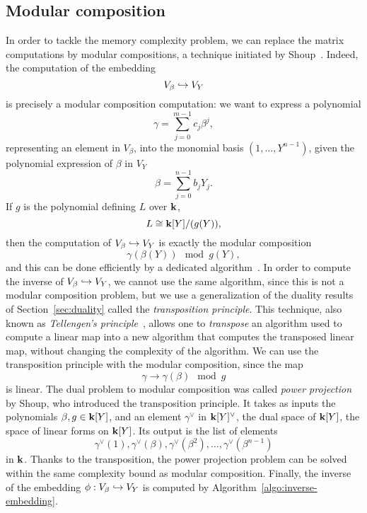 \subsection{Modular composition}
\label{sec:modular-composition}

In order to tackle the memory complexity problem, we can replace the matrix
computations by modular compositions, a technique initiated by
Shoup~\cite{Shoup94, Shoup95, Shoup99}. Indeed, the computation of the embedding
\[
  V_\beta\hookrightarrow V_Y
\]
is precisely a modular composition computation: we want to express a polynomial
\[
  \gamma = \sum_{j=0}^{m-1}c_j\beta^j,
\]
representing an element in $V_\beta$, into the monomial basis $(1, \dots,
Y^{n-1})$, given the polynomial expression of $\beta$ in $V_Y$
\[
  \beta = \sum_{j=0}^{n-1}b_j Y_j.
\]
If $g$ is the polynomial defining $L$ over $\mathbf{k}$, \ie
\[
  L \cong \mathbf{k}[Y]/(g(Y)),
\]
then the computation of $V_\beta\hookrightarrow V_Y$ is exactly the modular composition
\[
  \gamma(\beta(Y))\mod g(Y),
\]
and this can be done efficiently by a dedicated algorithm~\cite{KU08}.
In order to compute the inverse of $V_\beta\hookrightarrow V_Y$, we cannot use the same
algorithm, since this is not a modular composition problem, but we use a
generalization of the duality results of Section~\ref{sec:duality} called the
\emph{transposition principle}. This technique, also known as \emph{Tellengen's
principle}~\cite{BLS03, DeFeo10, DS10}, allows one to \emph{transpose} an
algorithm used to compute a linear map into a new algorithm that computes the
transposed linear map, without changing the complexity of the algorithm. We can
use the transposition principle with the modular composition, since the map
\[
  \gamma\to\gamma(\beta)\mod g
\]
is linear. The dual problem to modular composition was called \emph{power
projection} by Shoup, who introduced the transposition principle. It takes as
inputs the polynomials $\beta,g\in\mathbf{k}[Y]$, and an element $\gamma^\vee$ in
$\mathbf{k}[Y]^\vee$, the dual space of $\mathbf{k}[Y]$, \ie the space of linear forms on
$\mathbf{k}[Y]$. Its output is the list of elements
\[
  \gamma^\vee(1),\gamma^\vee(\beta),\gamma^\vee(\beta^2), \dots, \gamma^\vee(\beta^{n-1})
\]
in $\mathbf{k}$. Thanks to the transposition, the power projection problem can be solved
within the same complexity bound as modular composition. Finally, the inverse of
the embedding $\phi:V_\beta\hookrightarrow V_Y$ is computed by
Algorithm~\ref{algo:inverse-embedding}.
